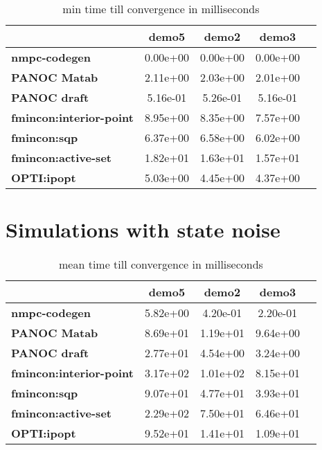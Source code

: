 \begin{table}[H]
	\centering
	\begin{tabular}{|l|	c|c|c|c|}
		\hline
		&\textbf{demo5}&\textbf{demo2}&\textbf{demo3}\\\hline
		\textbf{nmpc-codegen}&0.00e+00&0.00e+00&0.00e+00\\\hline
		\textbf{PANOC Matab}&2.11e+00&2.03e+00&2.01e+00\\\hline
		\textbf{PANOC draft}&5.16e-01&5.26e-01&5.16e-01\\\hline
		\textbf{fmincon:interior-point}&8.95e+00&8.35e+00&7.57e+00\\\hline
		\textbf{fmincon:sqp}&6.37e+00&6.58e+00&6.02e+00\\\hline
		\textbf{fmincon:active-set}&1.82e+01&1.63e+01&1.57e+01\\\hline
		\textbf{OPTI:ipopt}&5.03e+00&4.45e+00&4.37e+00\\\hline
	\end{tabular}
	\caption{min time till convergence in milliseconds}
	\label{tbl:min time till convergence}
\end{table}


\section{Simulations with state noise}
\label{appendix:benchmarks trailer with noise}

\begin{table}[H]
	\centering
	\begin{tabular}{|l|c|c|c|c|}
		\hline
		&\textbf{demo5}&\textbf{demo2}&\textbf{demo3}\\\hline
		\textbf{nmpc-codegen}&5.82e+00&4.20e-01&2.20e-01\\\hline
		\textbf{PANOC Matab}&8.69e+01&1.19e+01&9.64e+00\\\hline
		\textbf{PANOC draft}&2.77e+01&4.54e+00&3.24e+00\\\hline
		\textbf{fmincon:interior-point}&3.17e+02&1.01e+02&8.15e+01\\\hline
		\textbf{fmincon:sqp}&9.07e+01&4.77e+01&3.93e+01\\\hline
		\textbf{fmincon:active-set}&2.29e+02&7.50e+01&6.46e+01\\\hline
		\textbf{OPTI:ipopt}&9.52e+01&1.41e+01&1.09e+01\\\hline
	\end{tabular}
	\caption{mean time till convergence in milliseconds}
	\label{tbl:mean time till convergence with noise}
\end{table}

